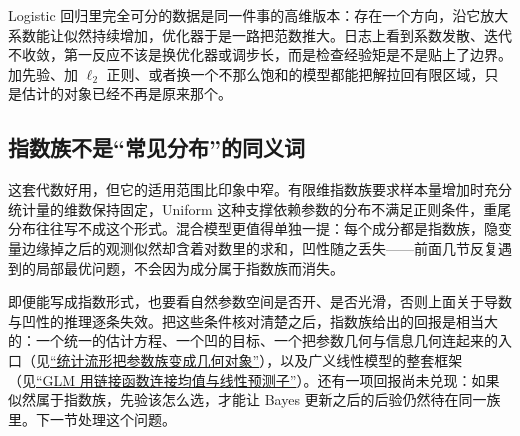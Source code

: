 Logistic 回归里完全可分的数据是同一件事的高维版本：存在一个方向，沿它放大系数能让似然持续增加，优化器于是一路把范数推大。日志上看到系数发散、迭代不收敛，第一反应不该是换优化器或调步长，而是检查经验矩是不是贴上了边界。加先验、加 \(\ell_2\) 正则、或者换一个不那么饱和的模型都能把解拉回有限区域，只是估计的对象已经不再是原来那个。

\subsection{指数族不是``常见分布''的同义词}

这套代数好用，但它的适用范围比印象中窄。有限维指数族要求样本量增加时充分统计量的维数保持固定，Uniform 这种支撑依赖参数的分布不满足正则条件，重尾分布往往写不成这个形式。混合模型更值得单独一提：每个成分都是指数族，隐变量边缘掉之后的观测似然却含着对数里的求和，凹性随之丢失——前面几节反复遇到的局部最优问题，不会因为成分属于指数族而消失。

即便能写成指数形式，也要看自然参数空间是否开、是否光滑，否则上面关于导数与凹性的推理逐条失效。把这些条件核对清楚之后，指数族给出的回报是相当大的：一个统一的估计方程、一个凹的目标、一个把参数几何与信息几何连起来的入口（见\hyperref[sec:12-Real-Analysis-Support/09-Information-Geometry/01]{``统计流形把参数族变成几何对象''}），以及广义线性模型的整套框架（见\hyperref[sec:13-Machine-Learning/02-Linear-Models/05]{``GLM 用链接函数连接均值与线性预测子''}）。还有一项回报尚未兑现：如果似然属于指数族，先验该怎么选，才能让 Bayes 更新之后的后验仍然待在同一族里。下一节处理这个问题。
